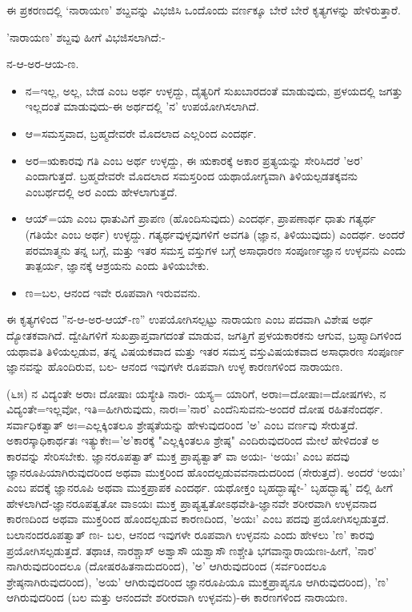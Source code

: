 ಈ ಪ್ರಕರಣದಲ್ಲಿ `ನಾರಾಯಣ' ಶಬ್ದವನ್ನು ವಿಭಜಿಸಿ ಒಂದೊಂದು ವರ್ಣಕ್ಕೂ ಬೇರೆ ಬೇರೆ ಕೃತ್ಯಗಳನ್ನು ಹೇಳಿರುತ್ತಾರೆ.

'ನಾರಾಯಣ' ಶಬ್ದವು ಹೀಗೆ ವಿಭಜಿಸಲಾಗಿದೆ:-

ನ-ಆ-ಅರ-ಆಯ-ಣ.

\begin{itemize}
\item ನ=ಇಲ್ಲ, ಅಲ್ಲ, ಬೇಡ ಎಂಬ ಅರ್ಥ ಉಳ್ಳದ್ದು, ದೈತ್ಯರಿಗೆ ಸುಖಬಾರದಂತೆ ಮಾಡುವುದು, ಪ್ರಳಯದಲ್ಲಿ ಜಗತ್ತು ಇಲ್ಲದಂತೆ ಮಾಡುವುದು-ಈ ಅರ್ಥದಲ್ಲಿ 'ನ' ಉಪಯೋಗಿಸಲಾಗಿದೆ.

 \item ಆ=ಸಮಸ್ತವಾದ, ಬ್ರಹ್ಮದೇವರೇ ಮೊದಲಾದ ಎಲ್ಲರಿಂದ ಎಂದರ್ಥ.

 \item ಅರ=ಋಕಾರವು ಗತಿ ಎಂಬ ಅರ್ಥ ಉಳ್ಳದ್ದು, ಈ ಋಕಾರಕ್ಕೆ ಅಕಾರ ಪ್ರತ್ಯಯನ್ನು ಸೇರಿಸಿದರೆ 'ಅರ' ಎಂದಾಗುತ್ತದೆ. ಬ್ರಹ್ಮದೇವರೇ ಮೊದಲಾದ ಸಮಸ್ತರಿಂದ ಯಥಾಯೋಗ್ಯವಾಗಿ ತಿಳಿಯಲ್ಪಡತಕ್ಕವನು ಎಂಬರ್ಥದಲ್ಲಿ ಅರ ಎಂದು ಹೇಳಲಾಗುತ್ತದೆ.

 \item ಆಯ್=ಯಾ ಎಂಬ ಧಾತುವಿಗೆ ಪ್ರಾಪಣ (ಹೊಂದಿಸುವುದು) ಎಂದರ್ಥ, ಪ್ರಾಪಣಾರ್ಥ ಧಾತು ಗತ್ಯರ್ಥ (ಗತಿಯೇ ಎಂಬ ಅರ್ಥ) ಉಳ್ಳದ್ದು. ಗತ್ಯರ್ಥವುಳ್ಳವುಗಳಿಗೆ ಅವಗತಿ (ಜ್ಞಾನ, ತಿಳಿಯುವುದು) ಎಂದರ್ಥ. ಅಂದರೆ ಪರಮಾತ್ಮನು ತನ್ನ ಬಗ್ಗೆ, ಮತ್ತು ಇತರ ಸಮಸ್ತ ವಸ್ತುಗಳ ಬಗ್ಗೆ ಅಸಾಧಾರಣ ಸಂಪೂರ್ಣಜ್ಞಾನ ಉಳ್ಳವನು ಎಂದು ತಾತ್ಪರ್ಯ, ಜ್ಞಾನಕ್ಕೆ ಆಶ್ರಯನು ಎಂದು ತಿಳಿಯಬೇಕು.

 \item ಣ=ಬಲ, ಆನಂದ ಇವೇ ರೂಪವಾಗಿ ಇರುವವನು.

\end{itemize}

ಈ ಕೃತ್ಯಗಳಿಂದ ''ನ-ಆ-ಅರ-ಆಯ್-ಣ'' ಉಪಯೋಗಿಸಲ್ಪಟ್ಟು ನಾರಾಯಣ ಎಂಬ ಪದವಾಗಿ ವಿಶೇಷ ಅರ್ಥ ದ್ಯೋತಕವಾಗಿದೆ. ದ್ವೇಷಿಗಳಿಗೆ ಸುಖಪ್ರಾಪ್ತವಾಗದಂತೆ ಮಾಡುವ, ಜಗತ್ತಿಗೆ ಪ್ರಳಯಕಾರಕನು ಆಗುವ, ಬ್ರಹ್ಮಾದಿಗಳಿಂದ ಯಥಾವತಿ ತಿಳಿಯಲ್ಪಡುವ, ತನ್ನ ವಿಷಯಕವಾದ ಮತ್ತು ಇತರ ಸಮಸ್ತ ವಸ್ತುವಿಷಯಕವಾದ ಅಸಾಧಾರಣ ಸಂಪೂರ್ಣ ಜ್ಞಾನವನ್ನು ಹೊಂದಿರುವ, ಬಲ- ಆನಂದ ಇವುಗಳೇ ರೂಪವಾಗಿ ಉಳ್ಳ ಕಾರಣಗಳಿಂದ ನಾರಾಯಣ.

(೬೫) ನ ವಿದ್ಯಂತೇ ಅರಾಃ ದೋಷಾಃ ಯಸ್ಯೇತಿ ನಾರಃ- ಯಸ್ಯ= ಯಾರಿಗೆ, ಅರಾಃ=ದೋಷಾಃ=ದೋಷಗಳು, ನ ವಿದ್ಯಂತೇ=ಇಲ್ಲವೋ, ಇತಿ=ಹೀಗಿರುವುದು, ನಾರಃ='ನಾರ' ಎಂದೆನಿಸುವನು-ಅಂದರೆ ದೋಷ ರಹಿತನೆಂದರ್ಥ. ಸರ್ವಾಧಿಕತ್ವಾತ್ ಅಃ=ಎಲ್ಲಕ್ಕಿಂತಲೂ ಶ್ರೇಷ್ಠತೆಯನ್ನು ಹೇಳುವುದರಿಂದ 'ಅ' ಎಂಬ ವರ್ಣವು ಸೇರುತ್ತದೆ. ಅಕಾರಸ್ಕಾಧಿಕಾರ್ಥತಃ ಇತ್ಯುಕೇಃ='ಅ'ಕಾರಕ್ಕೆ "ಎಲ್ಲಕ್ಕಿಂತಲೂ ಶ್ರೇಷ್ಠ" ಎಂದಿರುವುದರಿಂದ ಮೇಲೆ ಹೇಳಿದಂತೆ ಅ ಕಾರವನ್ನು ಸೇರಿಸಬೇಕು. ಜ್ಞಾನರೂಪತ್ವಾತ್ ಮುಕ್ತ ಪ್ರಾಪ್ಯತ್ವಾತ್ ವಾ ಅಯಃ- `ಅಯಃ' ಎಂಬ ಪದವು ಜ್ಞಾನರೂಪಿಯಾಗಿರುವುದರಿಂದ ಅಥವಾ ಮುಕ್ತರಿಂದ ಹೊಂದಲ್ಪಡುವವನಾದುದರಿಂದ (ಸೇರುತ್ತದೆ). ಅಂದರೆ `ಅಯಃ' ಎಂಬ ಪದಕ್ಕೆ ಜ್ಞಾನರೂಪಿ ಅಥವಾ ಮುಕ್ತಪ್ರಾಪಕ ಎಂದರ್ಥ. ಯಥೋಕ್ತಂ ಬೃಹದ್ಭಾಷ್ಯೇ-' ಬೃಹದ್ಭಾಷ್ಯ' ದಲ್ಲಿ ಹೀಗೆ ಹೇಳಲಾಗಿದೆ-ಜ್ಞಾನರೂಪತ್ವತೋ ವಾಽಯಃ ಮುಕ್ತ ಪ್ರಾಪ್ಯತ್ವತೋಽಥವೇತಿ-ಜ್ಞಾನವೇ ಶರೀರವಾಗಿ ಉಳ್ಳವನಾದ ಕಾರಣದಿಂದ ಅಥವಾ ಮುಕ್ತರಿಂದ ಹೊಂದಲ್ಪಡುವ ಕಾರಣದಿಂದ, 'ಅಯಃ' ಎಂಬ ಪದವು ಪ್ರಯೋಗಿಸಲ್ಪಡುತ್ತದೆ. ಬಲಾನಂದರೂಪತ್ವಾತ್ ಣಃ- ಬಲ, ಆನಂದ ಇವುಗಳೇ ರೂಪವಾಗಿ ಉಳ್ಳವನು ಎಂದು ಹೇಳಲು 'ಣ' ಕಾರವು ಪ್ರಯೋಗಿಸಲ್ಪಡುತ್ತದೆ. ತಥಾಚ, ನಾರಶ್ಚಾಸ್‌ ಅಶ್ವಾಸೌ ಯಶ್ವಾಸೌ ಣಶ್ಚೇತಿ ಭಗವಾನ್ನಾರಾಯಣಃ-ಹೀಗೆ, 'ನಾರ' ನಾಗಿರುವುದರಿಂದಲೂ (ದೋಷರಹಿತನಾದುದರಿಂದ), 'ಅ' ಆಗಿರುವುದರಿಂದ (ಸರ್ವರಿಂದಲೂ ಶ್ರೇಷ್ಠನಾಗಿರುವುದರಿಂದ), 'ಅಯ' ಆಗಿರುವುದರಿಂದ ಜ್ಞಾನರೂಪಿಯೂ ಮುಕ್ತಪ್ರಾಪ್ಯನೂ ಆಗಿರುವುದರಿಂದ), 'ಣ' ಆಗಿರುವುದರಿಂದ (ಬಲ ಮತ್ತು ಆನಂದವೇ ಶರೀರವಾಗಿ ಉಳ್ಳವನು)-ಈ ಕಾರಣಗಳಿಂದ ನಾರಾಯಣ.

